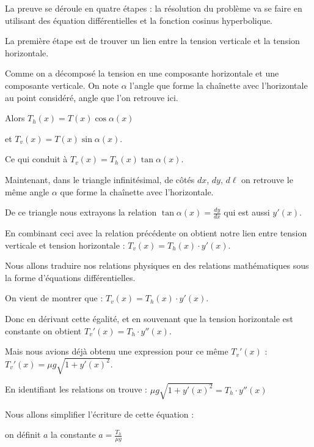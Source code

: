 \diapo

La preuve se déroule en quatre étapes : la résolution du problème va se faire
en utilisant des équation différentielles et la fonction cosinus hyperbolique.

La première étape est de trouver un lien entre la 
tension verticale et la tension horizontale.

\change
Comme on a décomposé la tension en une composante horizontale et une composante verticale.
On note $\alpha$ l'angle que forme la chaînette avec l'horizontale au point considéré,
angle que l'on retrouve ici.


\change
Alors $T_h(x) = T(x) \cos \alpha(x)$

\change
et 
$T_v(x) = T(x) \sin \alpha(x).$

\change
Ce qui conduit à $T_v(x) = T_h(x) \tan \alpha(x)$.

\change
Maintenant, dans le triangle infinitésimal, 
de côtés $dx$, $dy$, $d\ell$ on retrouve le même angle 
$\alpha$ que forme la chaînette avec l'horizontale.

\change
De ce triangle nous extrayons la relation  
$\tan \alpha(x) = \frac{dy}{dx}$ qui est aussi $y'(x)$.


\change

En combinant ceci avec la relation précédente on obtient
notre lien entre tension verticale et tension horizontale :
$T_v(x) = T_h(x) \cdot y'(x).$




\diapo

Nous allons traduire nos relations physiques en des relations 
mathématiques sous la forme d'équations différentielles.

\change
On vient de montrer que :
$T_v(x) = T_h(x) \cdot y'(x).$

\change
Donc en dérivant cette égalité, 
et en souvenant que la tension horizontale est constante
on obtient $T_v'(x) = T_h \cdot y''(x).$

\change
Mais nous avions déjà obtenu une expression pour ce même $T_v'(x)$ :
$T_v'(x) = \mu g \sqrt{1+ y'(x)^2}$.

\change
En identifiant les relations on trouve :
$\mu g \sqrt{1+ y'(x)^2} = T_h \cdot y''(x)$

\change
Nous allons simplifier l'écriture de cette équation :

on définit $a$ la constante $a =\frac{T_h}{\mu g}$


